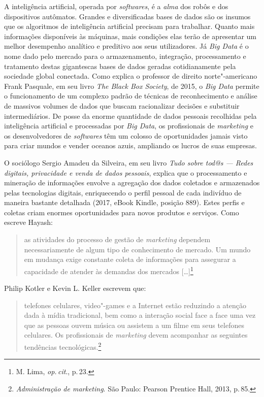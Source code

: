 A inteligência artificial, operada por \emph{softwares}, é a \emph{alma}
dos robôs e dos dispositivos autômatos. Grandes e diversificadas bases
de dados são os insumos que os algoritmos de inteligência artificial
precisam para trabalhar. Quanto mais informações disponíveis às
máquinas, mais condições elas terão de apresentar um melhor desempenho
analítico e preditivo aos seus utilizadores. Já \emph{Big Data} é o nome
dado pelo mercado para o armazenamento, integração, processamento e
tratamento destas gigantescas bases de dados geradas cotidianamente pela
sociedade global conectada. Como explica o professor de direito
norte"-americano Frank Pasquale, em seu livro \emph{The Black Box
Society}, de 2015, o \emph{Big Data} permite o funcionamento de um
complexo padrão de técnicas de reconhecimento e análise de massivos
volumes de dados que buscam racionalizar decisões e substituir
intermediários. De posse da enorme quantidade de dados pessoais
recolhidas pela inteligência artificial e processadas por \emph{Big
Data}, os profissionais de \textit{marketing} e os desenvolvedores de \emph{softwares}
têm um colosso de oportunidades jamais visto para criar mundos e vender
oceanos azuis, ampliando os lucros de suas empresas.

O sociólogo Sergio Amadeu da Silveira, em seu livro \emph{Tudo sobre tod@s --- Redes digitais, privacidade e venda
de dados pessoais}, explica que o processamento e mineração de
informações envolve a agregação dos dados coletados e armazenados pelas
tecnologias digitais, enriquecendo o perfil pessoal de cada indivíduo de
maneira bastante detalhada (2017, eBook Kindle, posição 889). Estes
perfis e coletas criam enormes oportunidades para novos produtos e
serviços. Como escreve Hayash:

\begin{quote}
as atividades do processo de gestão de \textit{marketing} dependem necessariamente de algum tipo de conhecimento de mercado. Um mundo em mudança exige constante coleta de
informações para assegurar a capacidade de atender às demandas dos
mercados {[}\ldots{}{]}\footnote{M. Lima, \emph{op.\,cit}., p.\,23.}
\end{quote}

Philip Kotler e Kevin L. Keller escrevem que:

\begin{quote}
telefones celulares, video"-games e a Internet estão reduzindo a
atenção dada à mídia tradicional, bem como a interação social face a
face uma vez que as pessoas ouvem música ou assistem a um filme em seus
telefones celulares. Os profissionais de \textit{marketing} devem acompanhar as
seguintes tendências tecnológicas.\footnote{\emph{Administração de
marketing}. São Paulo: Pearson Prentice Hall, 2013, p.\,85.}
\end{quote}

